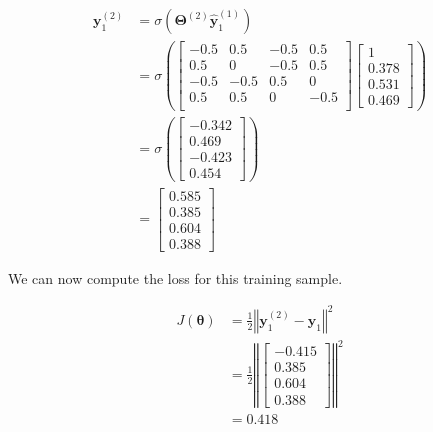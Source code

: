 \documentclass[a4paper, 10pt, twoside]{article}
\begin{document}
\begin{enumerate}[a)]
	      \begin{align*}
		      \bm{y}_1^{(2)}
		       & = \sigma\left(\bm{\Theta}^{(2)}\bm{\hat y}_1^{(1)}\right) \\
		       & = \sigma
		      \left(
		      \begin{bmatrix}
				      -0.5 & 0.5  & -0.5 & 0.5  \\
				      0.5  & 0    & -0.5 & 0.5  \\
				      -0.5 & -0.5 & 0.5  & 0    \\
				      0.5  & 0.5  & 0    & -0.5 \\
			      \end{bmatrix}
		      \begin{bmatrix}
				      1 \\ 0.378 \\ 0.531 \\ 0.469
			      \end{bmatrix}
		      \right)                                                      \\
		       & = \sigma
		      \left(
		      \begin{bmatrix}
				      -0.342 \\ 0.469 \\ -0.423 \\ 0.454
			      \end{bmatrix}
		      \right)                                                      \\
		       & =
		      \begin{bmatrix}
			      0.585 \\ 0.385 \\ 0.604 \\ 0.388
		      \end{bmatrix}
	      \end{align*}

	      We can now compute the loss for this training sample.

	      \begin{align*}
		      J(\bm{\theta})
		       & = \frac{1}{2} \left\Vert\bm{y}_1^{(2)} - \bm{y}_1\right\Vert^2 \\
		       & = \frac{1}{2}
		      \left\Vert
		      \begin{bmatrix}
			      -0.415 \\ 0.385 \\ 0.604 \\ 0.388
		      \end{bmatrix}
		      \right\Vert^2                                                     \\
		       & = 0.418
	      \end{align*}


\end{enumerate}
\end{document}
